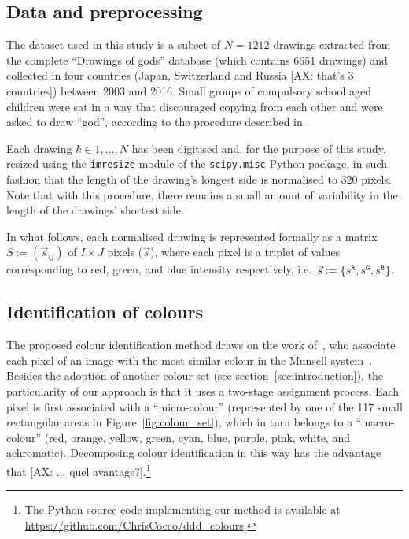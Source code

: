 \documentclass[11pt,a4paper]{article}
\begin{document}
\subsection{Data and preprocessing}
\label{sec:dataset_preprocessing}

The dataset used in this study is a subset of $N = 1212$ drawings extracted from the complete ``Drawings of gods'' database (which contains 6651 drawings) and collected in four countries (Japan, Switzerland and Russia {\color{red} [AX: that's 3 countries]}) between 2003 and 2016. Small groups of compulsory school aged children were sat in a way that discouraged copying from each other and were asked to draw ``god'', according to the procedure described in \citet{DandarovaRobertDessartSerbaevaEtAl2016}.

Each drawing $k \in 1,\dots, N$ has been digitised and, for the purpose of this study, resized using the {\tt imresize} module of the {\tt scipy.misc} Python package, in such fashion that the length of the drawing's longest side is normalised to 320 pixels. Note that with this procedure, there remains a small amount of variability in the length of the drawings' shortest side. 

In what follows, each normalised drawing is represented formally as a matrix $S := (\vec{s}_{ij})$ of $I \times J$ pixels ($\vec{s}$), where each pixel is a triplet of values corresponding to red, green, and blue intensity respectively, i.e.~$\vec{s} := \{ s^{\tt \scriptstyle R}, s^{\tt \scriptstyle G}, s^{\tt \scriptstyle B} \}$.

\subsection{Identification of colours}
\label{sec:identification}

The proposed colour identification method draws on the work of~\citet{kimbaelee2007}, who associate each pixel of an image with the most similar colour in the Munsell system~\cite{Munsell1912}. 
Besides the adoption of another colour set (see section~\ref{sec:introduction}), the particularity of our approach is that it uses a two-stage assignment process. Each pixel is first associated with a ``micro-colour'' (represented by one of the 117 small rectangular areas in Figure~\ref{fig:colour_set}), which in turn belongs to a ``macro-colour'' (red, orange, yellow, green, cyan, blue, purple, pink, white, and achromatic). Decomposing colour identification in this way has the advantage that {\color{red} [AX: ... quel avantage?]}.\footnote{The Python source code implementing our method is available at \url{https://github.com/ChrisCocco/ddd_colours}.}
\end{document}

